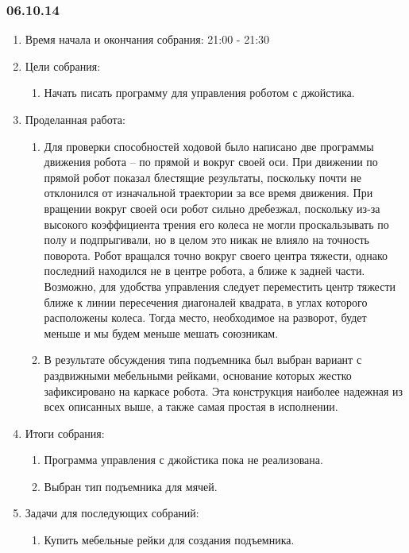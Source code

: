 \textsl{}
\subsubsection{06.10.14}

\begin{enumerate}
	\item Время начала и окончания собрания:
	21:00 - 21:30
	\item Цели собрания:
	\begin{enumerate}
	  \item Начать писать программу для управления роботом с джойстика.
	  
    \end{enumerate}
	\item Проделанная работа:
	\begin{enumerate}
	  \item Для проверки способностей ходовой было написано две программы движения робота – по прямой и вокруг своей оси. При движении по прямой робот показал блестящие результаты, поскольку почти не отклонился от изначальной траектории за все время движения. При вращении вокруг своей оси робот сильно дребезжал, поскольку из-за высокого коэффициента трения его колеса не могли проскальзывать по полу и подпрыгивали, но в целом это никак не влияло на точность поворота. Робот вращался точно вокруг своего центра тяжести, однако последний находился не в центре робота, а ближе к задней части. Возможно, для удобства управления следует переместить центр тяжести ближе к линии пересечения диагоналей квадрата, в углах которого расположены колеса. Тогда место, необходимое на разворот, будет меньше и мы будем меньше мешать союзникам.
      
      \item  В результате обсуждения типа подъемника был выбран вариант с раздвижными мебельными рейками, основание которых жестко зафиксировано на каркасе робота. Эта конструкция наиболее надежная из всех описанных выше, а также самая простая в исполнении.
      
    \end{enumerate}
    
	\item Итоги собрания: 
	\begin{enumerate}
	  \item  Программа управления с джойстика пока не реализована.
	  
      \item  Выбран тип подъемника для мячей.
    \end{enumerate}
    
	\item Задачи для последующих собраний:
	\begin{enumerate}
	  \item Купить мебельные рейки для создания подъемника.

    \end{enumerate}     
\end{enumerate}

\fillpage

